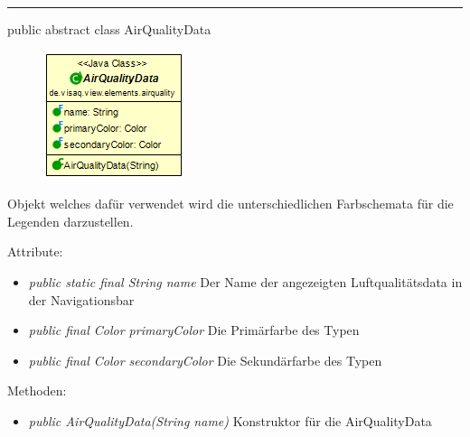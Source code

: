 
\rule{\textwidth}{0.4pt} 
public abstract class AirQualityData

\begin{minipage}{0.3\textwidth}
    \begin{figure}[H]
        \includegraphics[scale = 0.6]{media/frontend/view/de.view.elements.airquality/AirQualityData_Class.png}
    \end{figure}
    \end{minipage} \hfill
    \begin{minipage}{0.6\textwidth}
Objekt welches dafür verwendet wird die unterschiedlichen Farbschemata für die Legenden darzustellen.
\end{minipage}

Attribute:
\begin{itemize} 
    \item \emph{public static final String name} Der Name der angezeigten Luftqualitätsdata in der Navigationsbar
    \item \emph{public final Color primaryColor} Die Primärfarbe des Typen 
	\item \emph{public final Color secondaryColor} Die Sekundärfarbe des Typen
\end{itemize}
Methoden:
\begin{itemize} 
    \item \emph{public AirQualityData(String name)} Konstruktor für die AirQualityData
\end{itemize}

